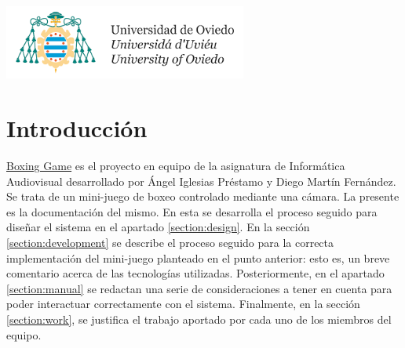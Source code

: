 \documentclass{article}
\begin{document}
\begin{titlepage}
    \centering
    \includegraphics[width=0.6\textwidth]{img/uniovi.png}
    \vfill
    {\huge\bfseries\titulo\par}
    \vspace{3cm}
    {\Large\itshape\autorAngel\par\vspace{0.1cm}\autorDiego\par}
    \vspace{1.5cm}
    {\LARGE\escuela\par}
    \vspace{0.5cm}
    {\Large\asignatura\par}
    \vfill
    \universidad\par
    \fecha
\end{titlepage}

\renewcommand{\contentsname}{Tabla de contenidos}
\tableofcontents{}
\newpage


\section{Introducción}

\href{https://angelip2303.github.io/boxing-docs/}{Boxing Game} es el proyecto en equipo de la asignatura de Informática Audiovisual desarrollado por Ángel Iglesias Préstamo y Diego Martín Fernández. Se trata de un mini-juego de boxeo controlado mediante una cámara. La presente es la documentación del mismo. En esta se desarrolla el proceso seguido para diseñar el sistema en el apartado \ref{section:design}. En la sección \ref{section:development} se describe el proceso seguido para la correcta implementación del mini-juego planteado en el punto anterior: esto es, un breve comentario acerca de las tecnologías utilizadas. Posteriormente, en el apartado \ref{section:manual} se redactan una serie de consideraciones a tener en cuenta para poder interactuar correctamente con el sistema. Finalmente, en la sección \ref{section:work}, se justifica el trabajo aportado por cada uno de los miembros del equipo.
\end{document}
